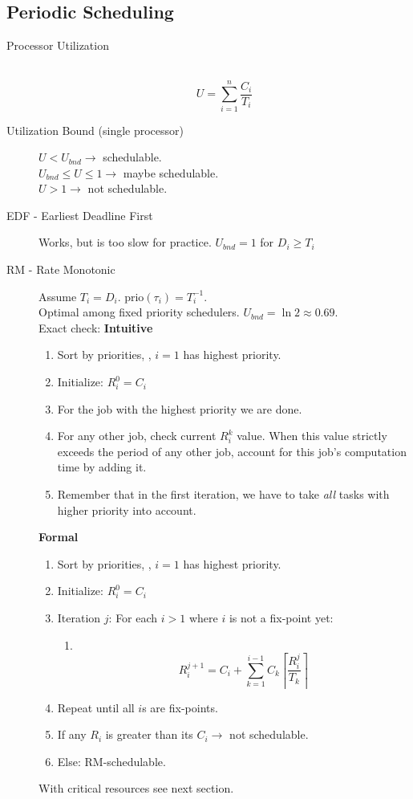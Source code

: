 \subsection{Periodic Scheduling}
\begin{description}
	\item[Processor Utilization] \ 
	\[ U = \sum_{i=1}^n \frac{C_i}{T_i} \]
	\item[Utilization Bound (single processor)] $U < U_{bnd} \rightarrow$
	schedulable.\\
	$U_{bnd} \leq U \leq 1 \rightarrow$ maybe schedulable.\\
	$U > 1 \rightarrow$ not schedulable.
	\item[EDF - Earliest Deadline First] Works, but is too slow for practice.
	$U_{bnd} = 1$ for $D_i \geq T_i$
	\item[RM - Rate Monotonic] Assume $T_i = D_i$. prio$(\tau_i) = T_i^{-1}$.\\
	Optimal among fixed priority schedulers. $U_{bnd} = \ln 2 \approx 0.69$.\\
	Exact check:
	\textbf{Intuitive}
	\begin{enumerate}
		\item Sort by priorities, \ie, $i = 1$ has highest priority.
		\item Initialize: $R^0_i = C_i$
		\item For the job with the highest priority we are done.
		\item For any other job, check current $R^k_i$ value. When this value strictly
		exceeds the period of any other job, account for this job's computation time
		by adding it.
		\item Remember that in the first iteration, we have to take \emph{all} tasks
		with higher priority into account.
	\end{enumerate}
	\textbf{Formal}
	\begin{enumerate}
		\item Sort by priorities, \ie, $i = 1$ has highest priority.
		\item Initialize: $R^0_i = C_i$
		\item Iteration $j$: For each $i > 1$ where $i$ is not a fix-point yet:
			\begin{enumerate}
				\item \ 
				\[ R_i^{j+1} = C_i + \sum_{k=1}^{i-1} C_k \left\lceil \frac{R_i^j}{T_k}
				\right\rceil \]
			\end{enumerate}
		\item Repeat until all $i$s are fix-points.
		\item If any $R_i$ is greater than its $C_i \rightarrow$ not schedulable.
		\item Else: RM-schedulable. 
	\end{enumerate}
	With critical resources see next section.
\end{description}

